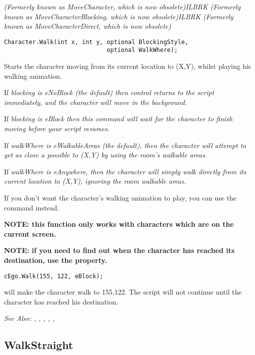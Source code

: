 \it{(Formerly known as MoveCharacter, which is now obsolete)}ILBRK
\it{(Formerly known as MoveCharacterBlocking, which is now obsolete)}ILBRK
\it{(Formerly known as MoveCharacterDirect, which is now obsolete)}

\begin{verbatim}
Character.Walk(int x, int y, optional BlockingStyle,
                             optional WalkWhere);
\end{verbatim}
Starts the character moving from its current location to (X,Y), whilst playing
his walking animation.

If \it{blocking} is eNoBlock (the default) then control returns to the script immediately, and
the character will move in the background.

If \it{blocking} is eBlock then this command will wait for the character
to finish moving before your script resumes.

If \it{walkWhere} is eWalkableAreas (the default), then the character will attempt to
get as close a possible to (X,Y) by using the room's walkable areas.

If \it{walkWhere} is eAnywhere, then the character will simply walk directly from its
current location to (X,Y), ignoring the room walkable areas.

If you don't want the character's walking animation to play, you can use the
 command instead.

\bf{NOTE:} this function only works with characters which are on the current screen.

\bf{NOTE:} if you need to find out when the character has reached its destination,
use the  property.

\begin{verbatim}
cEgo.Walk(155, 122, eBlock);
\end{verbatim}
will make the character walk to 155,122. The script will not continue until the
character has reached his destination.

\it{See Also:} ,
,
,
,
,


\subsection{WalkStraight}\label{Character.WalkStraight}%


